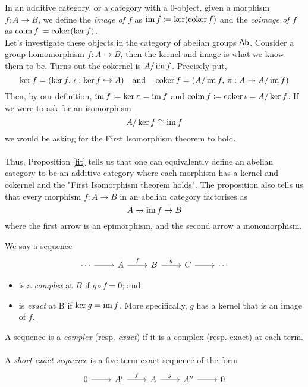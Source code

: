 \begin{remark}
In an additive category, or a category with a $0$-object, given a morphism $f:A \to B$, we define the \emph{image of $f$} as $\operatorname{im} f\coloneqq \ker(\operatorname{coker} f)$ and the \emph{coimage of $f$} as $\operatorname{coim}f \coloneqq \operatorname{coker}(\ker f)$.\\[1em]
Let's investigate these objects in the category of abelian groups $\mathsf{Ab}$. Consider a group homomorphism $f:A \to B$, then the kernel and image is what we know them to be. Turns out the cokernel is $A/\operatorname{im} f$. Precisely put, \[\ker f = (\ker f,\,\iota:\ker f \hookrightarrow A)\quad \text{and} \quad \operatorname{coker} f = (A/\operatorname{im} f,\, \pi: A \twoheadrightarrow A/\operatorname{im} f)\]
Then, by our definition, $\operatorname{im} f \coloneqq \ker \pi = \operatorname{im} f$ and $\operatorname{coim}f \coloneqq \operatorname{coker} \iota = A/\ker f$. If we were to ask for an isomorphism 
\[A/\ker f \cong \operatorname{im} f\]
we would be asking for the First Isomorphism theorem to hold.\\
\\
Thus, Proposition \ref{fit} tells us that one can equivalently define an abelian category to be an additive category where each morphism has a kernel and cokernel and the "First Isomorphism theorem holds". The proposition also tells us that every morphism $f:A \to B$ in an abelian category factorises as
\[A \to \operatorname{im} f \to B\]
where the first arrow is an epimorphism, and the second arrow a monomorphism.
\end{remark}


\begin{definition}
We say a sequence
\[\begin{tikzcd}
\cdots \arrow[r] & A \arrow[r,"f"] & B \arrow[r,"g"] & C \arrow[r] & \cdots
\end{tikzcd}\]
\begin{itemize}
\item is a \emph{complex} at $B$ if $g \circ f = 0$; and
\item is \emph{exact} at B if $\ker g = \operatorname{im} f$. More specifically, $g$ has a kernel that is an image of $f$.
\end{itemize}
A sequence is a \emph{complex} (resp. \emph{exact}) if it is a complex (resp. exact) at each term.\\
\\
A \emph{short exact sequence} is a five-term exact sequence of the form
\[\begin{tikzcd}
0 \arrow[r] & A' \arrow[r,"f"] & A \arrow[r,"g"] & A'' \arrow[r] & 0
\end{tikzcd}\]
\end{definition}


